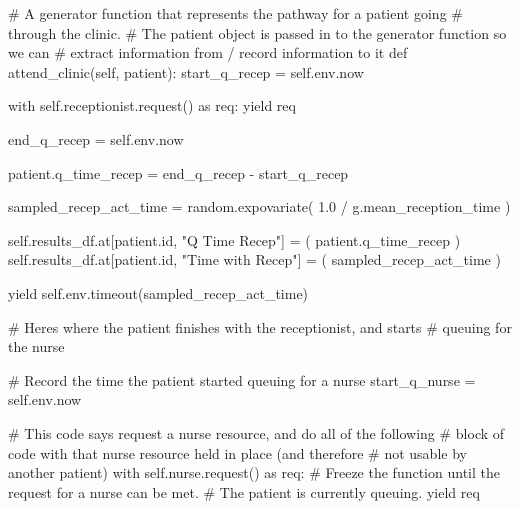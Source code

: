\documentclass[
  letterpaper,
  DIV=11,
  numbers=noendperiod]{scrreprt}
\newenvironment{Shaded}{\begin{snugshade}}{\end{snugshade}}
\newcommand{\BuiltInTok}[1]{\textcolor[rgb]{0.00,0.23,0.31}{#1}}
\newcommand{\CommentTok}[1]{\textcolor[rgb]{0.37,0.37,0.37}{#1}}
\newcommand{\ControlFlowTok}[1]{\textcolor[rgb]{0.00,0.23,0.31}{#1}}
\newcommand{\FloatTok}[1]{\textcolor[rgb]{0.68,0.00,0.00}{#1}}
\newcommand{\ImportTok}[1]{\textcolor[rgb]{0.00,0.46,0.62}{#1}}
\newcommand{\KeywordTok}[1]{\textcolor[rgb]{0.00,0.23,0.31}{#1}}
\newcommand{\NormalTok}[1]{\textcolor[rgb]{0.00,0.23,0.31}{#1}}
\newcommand{\OperatorTok}[1]{\textcolor[rgb]{0.37,0.37,0.37}{#1}}
\newcommand{\StringTok}[1]{\textcolor[rgb]{0.13,0.47,0.30}{#1}}
\newcommand{\VariableTok}[1]{\textcolor[rgb]{0.07,0.07,0.07}{#1}}
\begin{document}
\begin{tcolorbox}
\begin{Shaded}
\begin{Highlighting}[]
    \CommentTok{\# A generator function that represents the pathway for a patient going}
    \CommentTok{\# through the clinic.}
    \CommentTok{\# The patient object is passed in to the generator function so we can}
    \CommentTok{\# extract information from / record information to it}
    \KeywordTok{def}\NormalTok{ attend\_clinic(}\VariableTok{self}\NormalTok{, patient):}
\NormalTok{        start\_q\_recep }\OperatorTok{=} \VariableTok{self}\NormalTok{.env.now}

        \ControlFlowTok{with} \VariableTok{self}\NormalTok{.receptionist.request() }\ImportTok{as}\NormalTok{ req:}
            \ControlFlowTok{yield}\NormalTok{ req}

\NormalTok{            end\_q\_recep }\OperatorTok{=} \VariableTok{self}\NormalTok{.env.now}

\NormalTok{            patient.q\_time\_recep }\OperatorTok{=}\NormalTok{ end\_q\_recep }\OperatorTok{{-}}\NormalTok{ start\_q\_recep}

\NormalTok{            sampled\_recep\_act\_time }\OperatorTok{=}\NormalTok{ random.expovariate(}
                \FloatTok{1.0} \OperatorTok{/}\NormalTok{ g.mean\_reception\_time}
\NormalTok{            )}

            \VariableTok{self}\NormalTok{.results\_df.at[patient.}\BuiltInTok{id}\NormalTok{, }\StringTok{"Q Time Recep"}\NormalTok{] }\OperatorTok{=}\NormalTok{ (}
\NormalTok{                 patient.q\_time\_recep}
\NormalTok{            )}
            \VariableTok{self}\NormalTok{.results\_df.at[patient.}\BuiltInTok{id}\NormalTok{, }\StringTok{"Time with Recep"}\NormalTok{] }\OperatorTok{=}\NormalTok{ (}
\NormalTok{                 sampled\_recep\_act\_time}
\NormalTok{            )}

            \ControlFlowTok{yield} \VariableTok{self}\NormalTok{.env.timeout(sampled\_recep\_act\_time)}

        \CommentTok{\# Here\textquotesingle{}s where the patient finishes with the receptionist, and starts}
        \CommentTok{\# queuing for the nurse}

        \CommentTok{\# Record the time the patient started queuing for a nurse}
\NormalTok{        start\_q\_nurse }\OperatorTok{=} \VariableTok{self}\NormalTok{.env.now}

        \CommentTok{\# This code says request a nurse resource, and do all of the following}
        \CommentTok{\# block of code with that nurse resource held in place (and therefore}
        \CommentTok{\# not usable by another patient)}
        \ControlFlowTok{with} \VariableTok{self}\NormalTok{.nurse.request() }\ImportTok{as}\NormalTok{ req:}
            \CommentTok{\# Freeze the function until the request for a nurse can be met.}
            \CommentTok{\# The patient is currently queuing.}
            \ControlFlowTok{yield}\NormalTok{ req}


\end{Highlighting}
\end{Shaded}
\end{tcolorbox}
\end{document}
